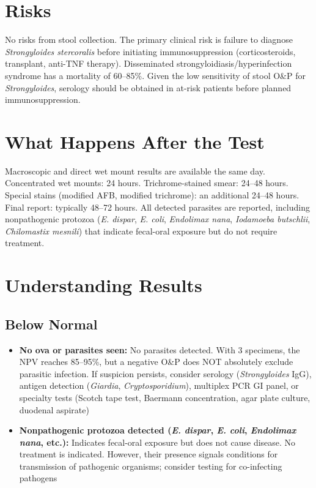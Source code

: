 \section*{Risks}
No risks from stool collection. The primary clinical risk is failure to diagnose \textit{Strongyloides stercoralis} before initiating immunosuppression (corticosteroids, transplant, anti-TNF therapy). Disseminated strongyloidiasis/hyperinfection syndrome has a mortality of 60--85\%. Given the low sensitivity of stool O\&P for \textit{Strongyloides}, serology should be obtained in at-risk patients before planned immunosuppression.

\section*{What Happens After the Test}
Macroscopic and direct wet mount results are available the same day. Concentrated wet mounts: 24 hours. Trichrome-stained smear: 24--48 hours. Special stains (modified AFB, modified trichrome): an additional 24--48 hours. Final report: typically 48--72 hours. All detected parasites are reported, including nonpathogenic protozoa (\textit{E. dispar}, \textit{E. coli}, \textit{Endolimax nana}, \textit{Iodamoeba butschlii}, \textit{Chilomastix mesnili}) that indicate fecal-oral exposure but do not require treatment.

\section*{Understanding Results}

\subsection*{Below Normal}
\begin{itemize}
  \item \textbf{No ova or parasites seen:} No parasites detected. With 3 specimens, the NPV reaches 85--95\%, but a negative O\&P does NOT absolutely exclude parasitic infection. If suspicion persists, consider serology (\textit{Strongyloides} IgG), antigen detection (\textit{Giardia}, \textit{Cryptosporidium}), multiplex PCR GI panel, or specialty tests (Scotch tape test, Baermann concentration, agar plate culture, duodenal aspirate)
  \item \textbf{Nonpathogenic protozoa detected (\textit{E. dispar}, \textit{E. coli}, \textit{Endolimax nana}, etc.):} Indicates fecal-oral exposure but does not cause disease. No treatment is indicated. However, their presence signals conditions for transmission of pathogenic organisms; consider testing for co-infecting pathogens
\end{itemize}

